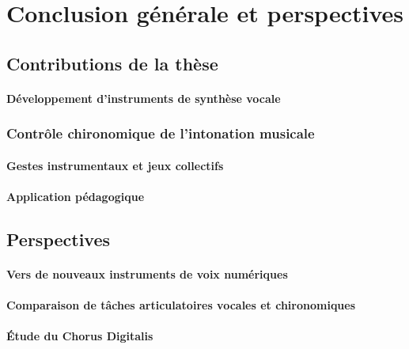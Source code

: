 

\chapter*{Conclusion générale et perspectives}
\mtcaddchapter

\mtcaddpart




\section*{Contributions de la thèse}

\subsubsection*{Développement d'instruments de synthèse vocale}

\lipsum[1-2]


\subsection*{Contrôle chironomique de l'intonation musicale}
\lipsum[1-2]

\subsubsection*{Gestes instrumentaux et jeux collectifs}
\lipsum[1-2]

\subsubsection*{Application pédagogique}
\lipsum[1-2]

\section*{Perspectives}

\subsubsection*{Vers de nouveaux instruments de voix numériques}
\lipsum[1-2]

\subsubsection*{Comparaison de tâches articulatoires vocales et chironomiques}
\lipsum[1-2]

\subsubsection*{Étude du Chorus Digitalis}
\lipsum[1-2]
